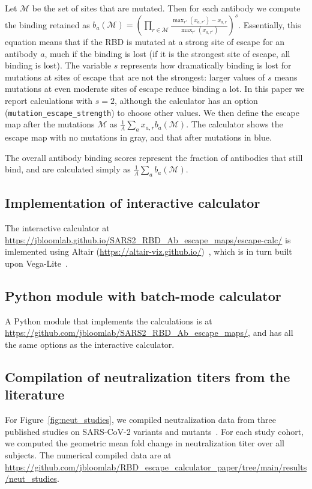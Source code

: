 \documentclass[9pt,twocolumn,twoside]{gsajnl_modified}
\begin{document}
{Let $\mathcal{M}$ be the set of sites that are mutated.
Then for each antibody we compute the binding retained as $b_a\left(\mathcal{M}\right) = \left(\prod\limits_{r \in \mathcal{M}} \frac{\max_{r'}\left(x_{a,r'}\right) - x_{a,r}}{\max_{r'}\left(x_{a,r'}\right)}\right)^s$. 
Essentially, this equation means that if the RBD is mutated at a strong site of escape for an antibody $a$, much if the binding is lost (if it is the strongest site of escape, all binding is lost).
The variable $s$ represents how dramatically binding is lost for mutations at sites of escape that are not the strongest: larger values of $s$ means mutations at even moderate sites of escape reduce binding a lot.
In this paper we report calculations with $s = 2$, although the calculator has an option (\texttt{mutation\_escape\_strength}) to choose other values.
We then define the escape map after the mutations $\mathcal{M}$ as $\frac{1}{A}\sum_a x_{a,r} b_a\left(\mathcal{M}\right)$.
The calculator shows the escape map with no mutations in gray, and that after mutations in blue.

The overall antibody binding scores represent the fraction of antibodies that still bind, and are calculated simply as $\frac{1}{A}\sum_a b_a\left(\mathcal{M}\right)$.

\subsection{Implementation of interactive calculator}
The interactive calculator at \url{https://jbloomlab.github.io/SARS2_RBD_Ab_escape_maps/escape-calc/} is imlemented using Altair (\url{https://altair-viz.github.io/})~\citep{VanderPlas2018}, which is in turn built upon Vega-Lite~\citep{Satyanarayan2017}.

\subsection{Python module with batch-mode calculator}
A Python module that implements the calculations is at \url{https://github.com/jbloomlab/SARS2_RBD_Ab_escape_maps/}, and has all the same options as the interactive calculator.

\subsection{Compilation of neutralization titers from the literature}
For Figure~\ref{fig:neut_studies}, we compiled neutralization data from three published studies on SARS-CoV-2 variants and mutants~\citep{lucas2021impact,uriu2021neutralization,wang2021antibody}.
For each study cohort, we computed the geometric mean fold change in neutralization titer over all subjects.
The numerical compiled data are at \url{https://github.com/jbloomlab/RBD_escape_calculator_paper/tree/main/results/neut_studies}.

}
\end{document}
